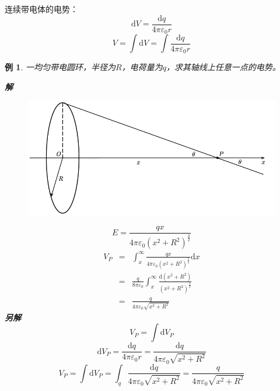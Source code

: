 \documentclass[12pt, a4paper, twoside]{ctexbook}
\newtheorem{example}[theorem]{例}
\begin{document}
{\sonti 连续带电体的电势}：
$$
\mathrm{d}V=\frac{\mathrm{d}q}{4\pi\varepsilon_0r}
$$
$$
V=\int\mathrm{d}V=\int\frac{\mathrm{d}q}{4\pi\varepsilon_0r}
$$
\begin{example}
    一均匀带电圆环，半径为$R$，电荷量为$q$，求其轴线上任意一点的电势。
    
    \noindent\textbf{解}
    \begin{figure}[H]
        \centerline{\includegraphics[scale=1.0]{CH09EX04.pdf}}
    \end{figure}
    $$
    E=\frac{qx}{4\pi\varepsilon_0\left(x^2+R^2\right)^{\frac{3}{2}}}
    $$
    \begin{eqnarray}
    V_P &=&\int_{x}^{\infty}\frac{qx}{4\pi\varepsilon_0\left(x^2+R^2\right)^{\frac{3}{2}}}\mathrm{d}x \nonumber \\
    ~&=&\frac{q}{8\pi\varepsilon_0}\int_{x}^{\infty}\frac{\mathrm{d}\left(x^2+R^2\right)}{\left(x^2+R^2\right)^{\frac{3}{2}}} \nonumber \\
    ~&=&\frac{q}{4\pi\varepsilon_0\sqrt{x^2+R^2}} \nonumber
    \end{eqnarray}
    \noindent\textbf{另解}
    $$
    V_P=\int\mathrm{d}V_P
    $$
    $$
    \mathrm{d}V_P=\frac{\mathrm{d}q}{4\pi\varepsilon_0r}=\frac{\mathrm{d}q}{4\pi\varepsilon_0\sqrt{x^2+R^2}}
    $$
    $$
    V_P=\int\mathrm{d}V_P=\int_q\frac{\mathrm{d}q}{4\pi\varepsilon_0\sqrt{x^2+R^2}}=\frac{q}{4\pi\varepsilon_0\sqrt{x^2+R^2}}
    $$
\end{example}
\end{document}
